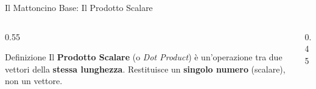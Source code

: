 \documentclass[aspectratio=169, 10pt]{beamer}
\begin{document}
\begin{frame}{Il Mattoncino Base: Il Prodotto Scalare}
    \begin{columns}[T] %
        
        \begin{column}{0.55\textwidth}
            \small %
            
            \begin{block}{Definizione}
                Il \textbf{Prodotto Scalare} (o \textit{Dot Product}) è un'operazione tra due vettori della \textbf{stessa lunghezza}.
                Restituisce un \textbf{singolo numero} (scalare), non un vettore.
            \end{block}
            
            \vspace{0.5em}
            
            
            \vspace{0.5em}
            
        \end{column}

        \begin{column}{0.45\textwidth}
            \centering
            \begin{tikzpicture}[scale=0.8] 
                

\end{tikzpicture}
\end{column}
\end{columns}
\end{frame}
\end{document}
